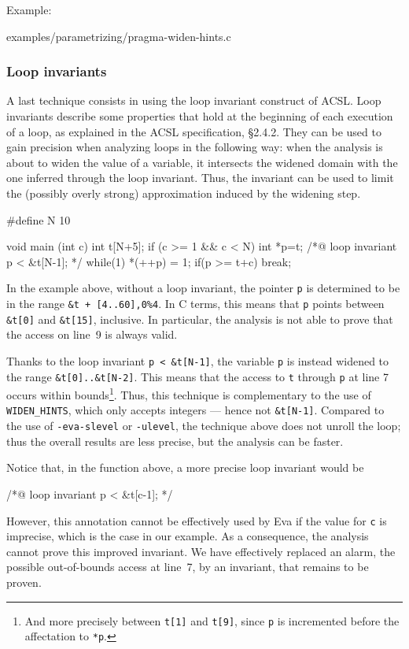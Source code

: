 \documentclass[web]{frama-c-book}
\newcommand{\Eva}{\textsf{Eva}}
\begin{document}
Example:

  {examples/parametrizing/pragma-widen-hints.c}

\subsubsection{Loop invariants}

A last technique consists in using the loop invariant construct of ACSL.
Loop invariants describe some
properties that hold at the beginning of each execution of a loop,
as explained in the ACSL specification, \S2.4.2.
%
They can be used to gain precision when analyzing loops in
the following way: when the analysis is about to widen the value of a
variable, it intersects the widened domain with the one inferred through
the loop invariant. Thus, the invariant can be used to limit the
(possibly overly strong) approximation induced by the widening step.

\begin{listing}{1}
#define N 10

void main (int c)
{
  int t[N+5];
  if (c >= 1 && c < N)
  {
    int *p=t;
    /*@ loop invariant p < &t[N-1]; */
    while(1)
    {
      *(++p) = 1;
      if(p >= t+c)
        break;
    }
  }
}
\end{listing}
In the example above, without a loop invariant, the pointer \lstinline+p+
is determined to be in the range \lstinline|&t + [4..60],0%4|. In C terms, this
means that \lstinline+p+ points between \lstinline+&t[0]+ 
and \lstinline+&t[15]+, inclusive. In particular, the analysis is not able
to prove that the access on line~9 is always valid.

Thanks to the loop invariant \lstinline|p < &t[N-1]|, the variable 
\lstinline+p+ is 
instead widened to the range \lstinline+&t[0]..&t[N-2]+.
This means that the access to \lstinline+t+ 
through \lstinline+p+ at line 7 occurs
within bounds\footnote{And more precisely between \lstinline+t[1]+ and
\lstinline+t[9]+, since \lstinline+p+
is incremented before the affectation to \lstinline+*p+.}.
Thus, this technique is complementary to the use of
\lstinline+WIDEN_HINTS+, which only accepts integers --- hence not
\lstinline+&t[N-1]+. Compared to the use 
of \lstinline+-eva-slevel+ or \lstinline+-ulevel+,
the technique above does not unroll the loop; thus the overall results
are less precise, but the analysis can be faster.

Notice that, in the function above, a more precise loop invariant would be
\begin{listing}{5}
/*@ loop invariant p < &t[c-1]; */
\end{listing}
However, this annotation cannot be effectively used by \Eva{}
if the value for \lstinline+c+ is imprecise, which is the case in our
example. As a consequence, the analysis cannot prove this improved invariant.
We have effectively replaced an alarm, the possible out-of-bounds access at
line~7, by an invariant, that remains to be proven.
\end{document}

